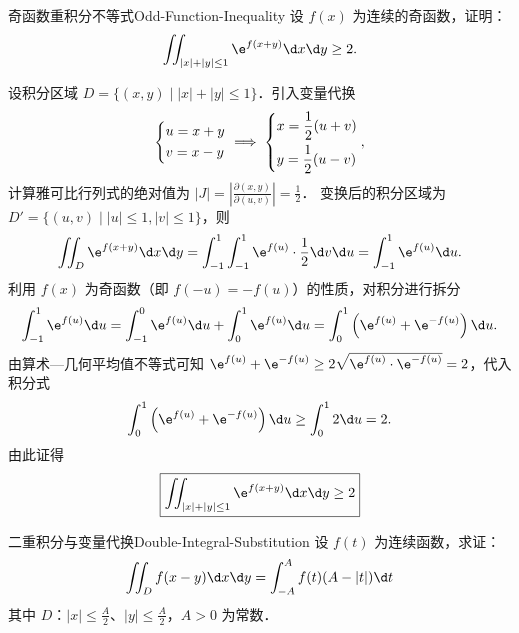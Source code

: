 \begin{problem}{奇函数重积分不等式}{Odd-Function-Inequality}
    设 $f(x)$ 为连续的奇函数，证明：
    \begin{equation}
        \iint_{|x|+|y| \le 1} \e^{f(x+y)} \d x \d y \ge 2.
    \end{equation}
\end{problem}

\begin{myproof}
    设积分区域 $D = \{ (x, y) \mid |x| + |y| \le 1 \}$．引入变量代换
    \begin{equation}
        \begin{dcases} u = x + y \\ v = x - y \end{dcases} \implies \begin{dcases} x = \frac{1}{2}(u + v) \\ y = \frac{1}{2}(u - v) \end{dcases},
    \end{equation}
    计算雅可比行列式的绝对值为 $|J| = \left| \frac{\partial(x, y)}{\partial(u, v)} \right| = \frac{1}{2}$．
    变换后的积分区域为 $D' = \{ (u, v) \mid |u| \le 1, |v| \le 1 \}$，则
    \begin{equation}
        \iint_D \e^{f(x+y)} \d x \d y = \int_{-1}^1 \int_{-1}^1 \e^{f(u)} \cdot \frac{1}{2} \d v \d u = \int_{-1}^1 \e^{f(u)} \d u.
    \end{equation}
    利用 $f(x)$ 为奇函数（即 $f(-u) = -f(u)$）的性质，对积分进行拆分
    \begin{equation}
        \int_{-1}^1 \e^{f(u)} \d u = \int_{-1}^0 \e^{f(u)} \d u + \int_0^1 \e^{f(u)} \d u = \int_0^1 \left( \e^{f(u)} + \e^{-f(u)} \right) \d u.
    \end{equation}
    由算术—几何平均值不等式可知 $\e^{f(u)} + \e^{-f(u)} \ge 2\sqrt{\e^{f(u)} \cdot \e^{-f(u)}} = 2$，代入积分式
    \begin{equation}
        \int_0^1 \left( \e^{f(u)} + \e^{-f(u)} \right) \d u \ge \int_0^1 2 \d u = 2.
    \end{equation}
    由此证得
    \begin{equation}
        \boxed{\iint_{|x|+|y| \le 1} \e^{f(x+y)} \d x \d y \ge 2}
    \end{equation}
\end{myproof}


\begin{problem}{二重积分与变量代换}{Double-Integral-Substitution}
    设 $f(t)$ 为连续函数，求证：
    \begin{equation}
        \iint_D f(x - y) \d x \d y = \int_{-A}^A f(t)(A - |t|) \d t
    \end{equation}
    其中 $D$：$|x| \le \frac{A}{2}$、$|y| \le \frac{A}{2}$，$A > 0$ 为常数．
\end{problem}

